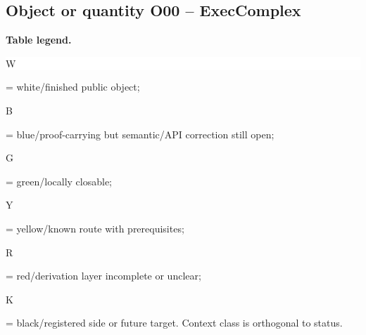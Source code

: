 \subsection*{Object or quantity O00 -- ExecComplex}
\hypertarget{objproof:O00}{}
\par\smallskip\noindent\begin{minipage}{0.99\linewidth}\footnotesize\raggedright\textbf{Table legend.} \colorbox{white}{\strut W} = white/finished public object; \colorbox{cyan!20}{\strut B} = blue/proof-carrying but semantic/API correction still open; \colorbox{green!18}{\strut G} = green/locally closable; \colorbox{yellow!25}{\strut Y} = yellow/known route with prerequisites; \colorbox{red!20}{\strut R} = red/derivation layer incomplete or unclear; \colorbox{black!18}{\strut K} = black/registered side or future target. Context class is orthogonal to status.\end{minipage}\par\vspace{0.25em}
